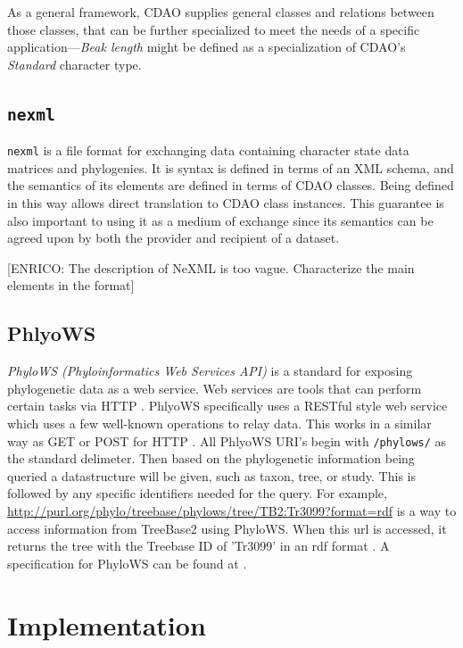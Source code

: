 \documentclass[10pt]{bmc_article}
\newenvironment{bmcformat}{\begin{raggedright}\baselineskip20pt\sloppy\setboolean{publ}{false}}{\end{raggedright}\baselineskip20pt\sloppy}
\begin{document}
\begin{bmcformat}
  As a general framework, CDAO supplies general classes and relations between those classes, 
  that can be further specialized to meet the needs of a specific application---\emph{Beak length}
   might be defined as a specialization of CDAO's \textit{Standard} 
  character type.
   

\subsection*{\tt nexml}
  {\tt nexml} \cite{nexml} is a file format for exchanging data containing character state data
  matrices and phylogenies. It is syntax is defined in terms of an XML schema, and the semantics of its elements
  are defined in terms of CDAO classes. Being defined in this way allows direct translation to CDAO class instances.
  This guarantee is also important to using it as a medium of exchange since its semantics can be agreed upon by
  both the provider and recipient of a dataset.
  
  [ENRICO: The description of NeXML is too vague. Characterize the main elements in the format]

\subsection*{PhlyoWS}
  \emph{PhyloWS (Phyloinformatics Web Services API)} is a standard for exposing 
  phylogenetic data as a web service. Web services are tools that can perform certain tasks via HTTP \cite{WebService}.
  PhlyoWS specifically uses a RESTful style web service which uses a few well-known operations to relay data\cite{PhyloWSwiki}\cite{WebService}.
  This works in a similar way as GET or POST for HTTP  \cite{WebService}.  All PhlyoWS URI's begin with {\tt /phylows/} as the 
  standard delimeter. Then based on the phylogenetic information being queried a datastructure will be given, such as taxon, tree, or study.
  This is followed by any specific identifiers needed for the query.  For example, \url{http://purl.org/phylo/treebase/phylows/tree/TB2:Tr3099?format=rdf}
  is a way to access information from TreeBase2 using PhyloWS.  When this url is accessed, it returns the tree with the Treebase ID of 'Tr3099' in an
  rdf format \cite{treebasePhyloWS}. A specification for PhyloWS can be found at \cite{PhyloWSwiki}.
\section*{Implementation}


\end{bmcformat}
\end{document}
